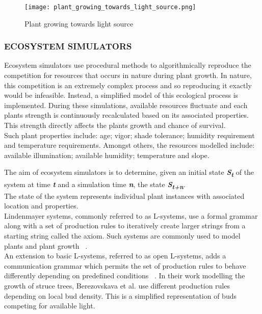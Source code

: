 \begin{figure}[h]
  \centering
	    \texttt{[image: plant\_growing\_towards\_light\_source.png]}
	\caption{Plant growing towards light source ~\cite{Soler2001} }
	\label{Plant growing towards light source}
\end{figure}

\subsubsection{ECOSYSTEM SIMULATORS}

Ecosystem simulators use procedural methods to algorithmically reproduce the competition for resources that occurs in nature during plant growth. In nature, this competition is an extremely complex process and so reproducing it exactly would be infeasible. Instead, a simplified model of this ecological process is implemented. During these simulations, available resources fluctuate and each plants strength is continuously recalculated based on its associated properties. This strength directly affects the plants growth and chance of survival. \\
Such plant properties include: age; vigor; shade tolerance; humidity requirement and temperature requirements. Amongst others, the resources modelled include: available illumination; available humidity; temperature and slope.

The aim of ecosystem simulators is to determine, given an initial state \textbf{\textit{S\textsubscript{t}}} of the system at time \textbf{\textit{t}} and a simulation time \textbf{\textit{n}}, the state \textbf{\textit{S\textsubscript{t+n}}}. \\
The state of the system represents individual plant instances with associated location and properties. \\

Lindenmayer systems, commonly referred to as L-systems, use a formal grammar along with a set of production rules to iteratively create larger strings from a starting string called the axiom. Such systems are commonly used to model plants and plant growth ~\cite{Prusinkiewicz1990,Deussen2002,Boudon2012,Prusinkiewicz1993}. \\
An extension to basic L-systems, referred to as open L-systems, adds a communication grammar which permits the set of production rules to behave differently depending on predefined conditions ~\cite{Prusinkiewicz1996}. In their work modelling the growth of struce trees, Berezovskava et al. \cite{Berezovskava1997} use different production rules depending on local bud density. This is a simplified representation of buds competing for available light. \\

